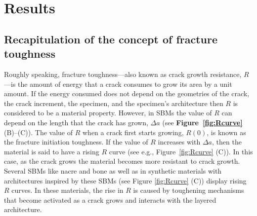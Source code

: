 \documentclass[12pt,onecolumn]{article}
\begin{document}
\section*{Results}
\label{sec:res}

\subsection*{Recapitulation of the concept of fracture toughness}
\label{sec:tdef}

Roughly speaking, fracture toughness---also known as crack growth resistance, $R$---is the amount of energy that a crack consumes to grow its area by a unit amount. If the energy consumed does not depend on the geometries of the crack, the crack increment, the specimen, and the specimen's architecture then $R$ is considered to be a material property. However, in SBMs the value of $R$ can depend on the length that the crack has grown, $\Delta a$ (see {\bf Figure~\ref{fig:Rcurve}} (B)--(C)). The value of $R$ when a crack first starts growing, $R(0)$, is known as the fracture initiation toughness. If the value of $R$ increases with $\Delta a$, then the material is said to have a rising $R$ curve (see e.g., Figure~\ref{fig:Rcurve} (C)). 
%
In this case, as the crack grows the material becomes more resistant to crack growth. Several SBMs like nacre and bone  \cite{barthelat2007experimental,rabiei2010failure,nalla2005mechanistic,launey2009mechanistic} as well as in synthetic materials with architectures inspired by these SBMs (see Figure \ref{fig:Rcurve} (C)) \cite{ritchie2011conflicts} display rising $R$ curves. In these materials, the rise in $R$ is caused by toughening mechanisms that become activated as a crack grows and interacts with the layered architecture.
%
\end{document}
